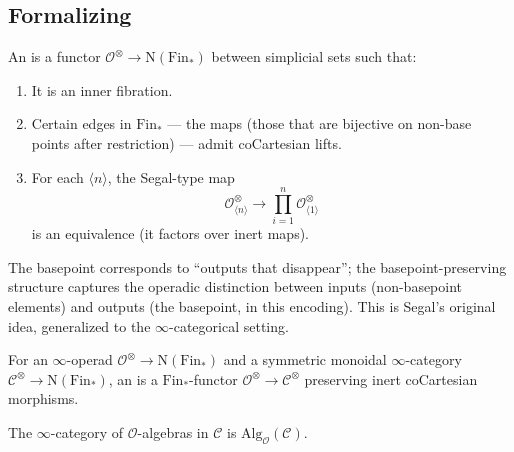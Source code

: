 \subsection{Formalizing}

\begin{definition}
\label{def:infty-operad}
An  is a functor $\mathcal{O}^\otimes \to
\mathrm{N}(\mathrm{Fin}_*)$ between simplicial sets such that:
\begin{enumerate}
  \item It is an inner fibration.
  \item Certain edges in $\mathrm{Fin}_*$ — the  maps
        (those that are bijective on non-base points after restriction)
        — admit coCartesian lifts.
  \item For each $\langle n \rangle$, the Segal-type map
        \begin{equation*}
          \mathcal{O}^\otimes_{\langle n \rangle} \to \prod_{i = 1}^n \mathcal{O}^\otimes_{\langle 1 \rangle}
        \end{equation*}
        is an equivalence (it factors over inert maps).
\end{enumerate}
\end{definition}

\begin{remark}
The basepoint corresponds to ``outputs that disappear''; the
basepoint-preserving structure captures the operadic distinction between
inputs (non-basepoint elements) and outputs (the basepoint, in this
encoding). This is Segal's original idea, generalized to the
$\infty$-categorical setting.
\end{remark}

\begin{definition}
\label{def:operad-algebra}
For an $\infty$-operad $\mathcal{O}^\otimes \to \mathrm{N}(\mathrm{Fin}_*)$
and a symmetric monoidal $\infty$-category $\mathcal{C}^\otimes \to
\mathrm{N}(\mathrm{Fin}_*)$, an 
is a $\mathrm{Fin}_*$-functor $\mathcal{O}^\otimes \to \mathcal{C}^\otimes$
preserving inert coCartesian morphisms.

The $\infty$-category of $\mathcal{O}$-algebras in $\mathcal{C}$ is
$\mathrm{Alg}_\mathcal{O}(\mathcal{C})$.
\end{definition}


